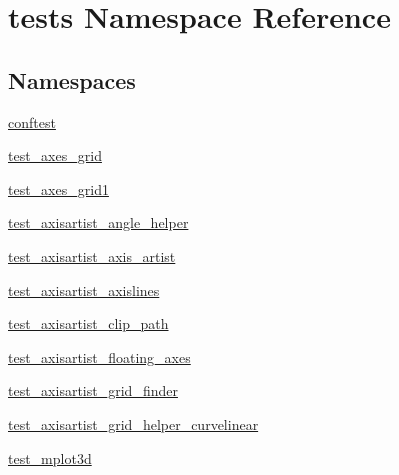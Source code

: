 \hypertarget{namespacetests}{}\section{tests Namespace Reference}
\label{namespacetests}
\subsection*{Namespaces}
\begin{DoxyCompactItemize}
\item 
 \hyperlink{namespacetests_1_1conftest}{conftest}
\item 
 \hyperlink{namespacetests_1_1test__axes__grid}{test\+\_\+axes\+\_\+grid}
\item 
 \hyperlink{namespacetests_1_1test__axes__grid1}{test\+\_\+axes\+\_\+grid1}
\item 
 \hyperlink{namespacetests_1_1test__axisartist__angle__helper}{test\+\_\+axisartist\+\_\+angle\+\_\+helper}
\item 
 \hyperlink{namespacetests_1_1test__axisartist__axis__artist}{test\+\_\+axisartist\+\_\+axis\+\_\+artist}
\item 
 \hyperlink{namespacetests_1_1test__axisartist__axislines}{test\+\_\+axisartist\+\_\+axislines}
\item 
 \hyperlink{namespacetests_1_1test__axisartist__clip__path}{test\+\_\+axisartist\+\_\+clip\+\_\+path}
\item 
 \hyperlink{namespacetests_1_1test__axisartist__floating__axes}{test\+\_\+axisartist\+\_\+floating\+\_\+axes}
\item 
 \hyperlink{namespacetests_1_1test__axisartist__grid__finder}{test\+\_\+axisartist\+\_\+grid\+\_\+finder}
\item 
 \hyperlink{namespacetests_1_1test__axisartist__grid__helper__curvelinear}{test\+\_\+axisartist\+\_\+grid\+\_\+helper\+\_\+curvelinear}
\item 
 \hyperlink{namespacetests_1_1test__mplot3d}{test\+\_\+mplot3d}
\end{DoxyCompactItemize}
